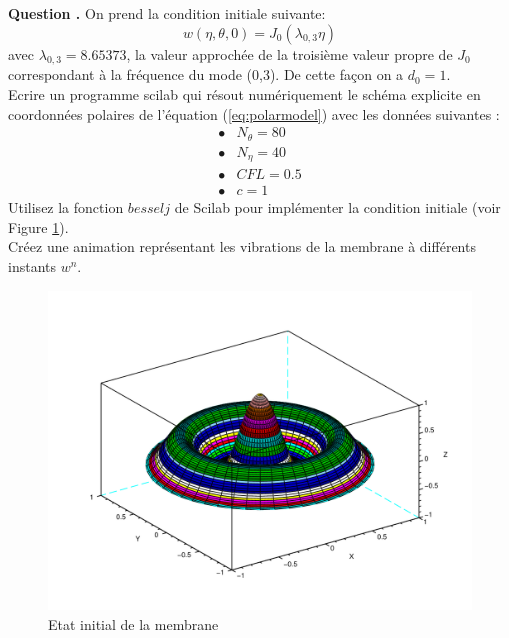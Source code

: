 \documentclass[a4,12pt]{article}
\newcounter{Nbquestion}
\newcommand*\question{%
\stepcounter{Nbquestion}%
\textbf{Question \theNbquestion. }}
\begin{document}
\begin{mdframed}[style=exampledefault]
\question On prend la condition initiale suivante:
\begin{equation}
	w(\eta,\theta,0)=J_0(\lambda_{0,3}\eta)
	\label{eq:condinit}
\end{equation}
avec $\lambda_{0,3}=8.65373$, la valeur approchée de la troisième valeur propre de $J_0$ correspondant à la fréquence du mode (0,3). De cette façon on a $d_0=1$.\\

Ecrire un programme scilab qui résout numériquement le schéma explicite en coordonnées polaires de l'équation (\ref{eq:polarmodel}) avec les données suivantes : 
\[
\begin{array}{ll}
	\bullet & N_\theta=80 \\ 
	\bullet & N_\eta=40 \\ 
	\bullet & CFL=0.5 \\ 
	\bullet & c=1
\end{array}
\]
Utilisez la fonction $besselj$ de Scilab pour implémenter la condition initiale (voir Figure \ref{fig:bessel}).\\
Créez une animation représentant les vibrations de la membrane à différents instants $w^n$.
\end{mdframed}


\begin{figure}[H]
	\begin{center}
		\includegraphics[scale=0.4]{images/joinitial.pdf}
		\caption{Etat initial de la membrane}
		\label{fig:bessel}
	\end{center}
\end{figure}
\end{document}

